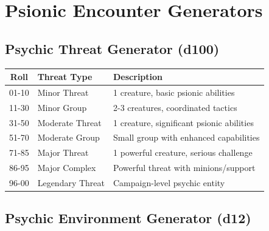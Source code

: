 \documentclass[11pt,twoside]{article}
\begin{document}
\section{Psionic Encounter Generators}

\subsection{Psychic Threat Generator (d100)}

\begin{center}
\begin{longtable}{|c|l|p{7cm}|}
\hline
\rowcolor{headerblue!10}
\textbf{Roll} & \textbf{Threat Type} & \textbf{Description} \\
\hline
01-10 & Minor Threat & 1 creature, basic psionic abilities \\
11-30 & Minor Group & 2-3 creatures, coordinated tactics \\
31-50 & Moderate Threat & 1 creature, significant psionic abilities \\
51-70 & Moderate Group & Small group with enhanced capabilities \\
71-85 & Major Threat & 1 powerful creature, serious challenge \\
86-95 & Major Complex & Powerful threat with minions/support \\
96-00 & Legendary Threat & Campaign-level psychic entity \\
\hline
\end{longtable}
\end{center}

\subsection{Psychic Environment Generator (d12)}
\end{document}
